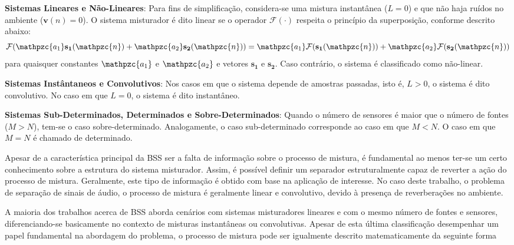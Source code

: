     \textbf{Sistemas Lineares e Não-Lineares}: Para fins de simplificação, considera-se uma mistura instantânea ($L=0$) e que não haja ruídos no ambiente ($\mathbf{v}(n)=0$). O sistema misturador é dito linear se o operador  $\mathcal{F}(\cdot)$ respeita o princípio da superposição, conforme descrito abaixo:
        \begin{equation}\label{eq:linearity}
            \mathcal{F}(\mathpzc{a_1}\mathbf{s_1}(\mathpzc{n}) + \mathpzc{a_2}\mathbf{s_2}(\mathpzc{n})) = \mathpzc{a_1}\mathcal{F}(\mathbf{s_1}(\mathpzc{n})) + \mathpzc{a_2}\mathcal{F}(\mathbf{s_2}(\mathpzc{n}))
        \end{equation}
    para quaisquer constantes $\mathpzc{a_1}$ e $\mathpzc{a_2}$ e vetores $\mathbf{s_1}$ e $\mathbf{s_2}$. Caso contrário, o sistema é classificado como não-linear. 
    
     \textbf{Sistemas Instântaneos e Convolutivos}: Nos casos em que o sistema depende de amostras passadas, isto é, $L>0$, o sistema é dito convolutivo. No caso em que $L=0$, o sistema é dito instantâneo.
    
     \textbf{Sistemas Sub-Determinados, Determinados e Sobre-Determinados}: Quando o número de sensores é maior que o número de fontes ($M>N$), tem-se o caso sobre-determinado. Analogamente, o caso sub-determinado corresponde ao caso em que $M<N$. O caso em que $M=N$ é chamado de determinado.
     
     Apesar de a característica principal da BSS ser a falta de informação sobre o processo de mistura, é fundamental ao menos ter-se um certo conhecimento sobre a estrutura do sistema misturador. Assim, é possível definir um separador estruturalmente capaz de reverter a ação do processo de mistura. Geralmente, este tipo de informação é obtido com base na aplicação de interesse. No caso deste trabalho, o problema de separação de sinais de áudio, o processo de mistura é geralmente linear e convolutivo, devido à presença de reverberações no ambiente.
     
     A maioria dos trabalhos acerca de BSS aborda cenários com sistemas misturadores lineares e com o mesmo número de fontes e sensores, diferenciando-se basicamente no contexto de misturas instantâneas ou convolutivas. Apesar de esta última classificação desempenhar um papel fundamental na abordagem do problema, o  processo de mistura pode ser igualmente descrito matematicamente da seguinte forma
     
